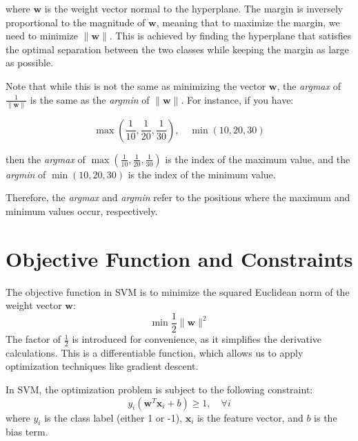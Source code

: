 where \( \mathbf{w} \) is the weight vector normal to the hyperplane. The margin is inversely proportional to the magnitude of \( \mathbf{w} \), meaning that to maximize the margin, we need to minimize \( \| \mathbf{w} \| \). This is achieved by finding the hyperplane that satisfies the optimal separation between the two classes while keeping the margin as large as possible. 

Note that while this is not the same as minimizing the vector \( \mathbf{w} \), the \textit{argmax} of \( \frac{1}{\| \mathbf{w} \|} \) is the same as the \textit{argmin} of \( \| \mathbf{w} \| \). For instance, if you have:

\[
\max(\frac{1}{10}, \frac{1}{20}, \frac{1}{30}), \quad \min(10, 20, 30)
\]

then the \textit{argmax} of \( \max(\frac{1}{10}, \frac{1}{20}, \frac{1}{30}) \) is the index of the maximum value, and the \textit{argmin} of \( \min(10, 20, 30) \) is the index of the minimum value. 

Therefore, the \textit{argmax} and \textit{argmin} refer to the positions where the maximum and minimum values occur, respectively.

\section{Objective Function and Constraints}

The objective function in SVM is to minimize the squared Euclidean norm of the weight vector \( \mathbf{w} \):
\[
\min \frac{1}{2} \| \mathbf{w} \|^2
\]
The factor of \( \frac{1}{2} \) is introduced for convenience, as it simplifies the derivative calculations. This is a differentiable function, which allows us to apply optimization techniques like gradient descent.

In SVM, the optimization problem is subject to the following constraint:
\[
y_i (\mathbf{w}^T \mathbf{x}_i + b) \geq 1, \quad \forall i
\]
where \( y_i \) is the class label (either 1 or -1), \( \mathbf{x}_i \) is the feature vector, and \( b \) is the bias term.

